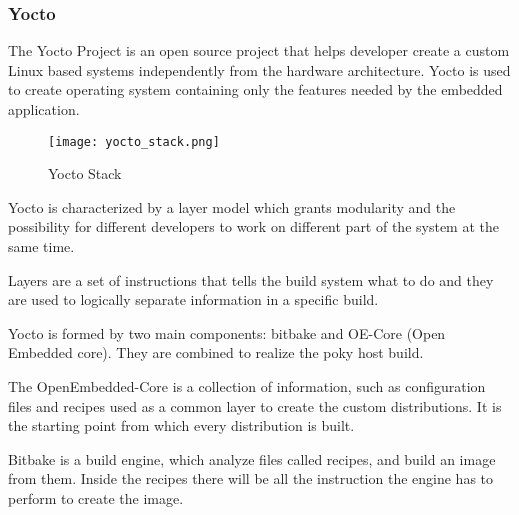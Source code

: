 \subsubsection{Yocto}

The Yocto Project is an open source project that helps developer create a
custom Linux based systems independently from the hardware architecture.
\cite{yocto}
Yocto is used to create operating system containing only the features
needed by the embedded application. 

\begin{figure}[h]
    \centering
    \texttt{[image: yocto\_stack.png]}
    \caption{Yocto Stack}
    \label{fig:yocto_stack}
\end{figure}

Yocto is characterized by a layer model which grants modularity and the
possibility for different developers to work on different part of the system
at the same time.

Layers are a set of instructions that tells the build system what to do
and they are used to logically separate information in a specific build.

Yocto is formed by two main components: bitbake and OE-Core (Open Embedded core).
They are combined to realize the poky host build.

The OpenEmbedded-Core is a collection of information, such as configuration
files and recipes used as a common layer to create the custom distributions.
It is the starting point from which every distribution is built.

Bitbake is a build engine, which analyze files called recipes, and build an
image from them. Inside the recipes there will be all the instruction the
engine has to perform to create the image.

